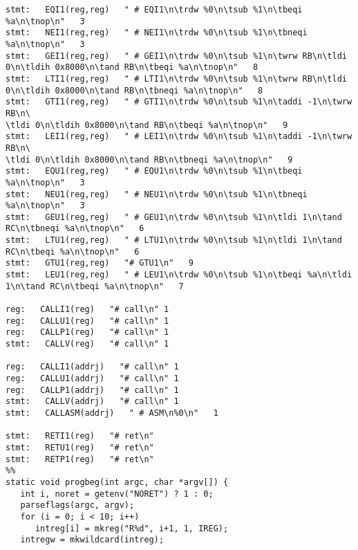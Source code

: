 {\begin{verbatim}
stmt:   EQI1(reg,reg)   " # EQI1\n\trdw %0\n\tsub %1\n\tbeqi %a\n\tnop\n"   3
stmt:   NEI1(reg,reg)   " # NEI1\n\trdw %0\n\tsub %1\n\tbneqi %a\n\tnop\n"   3
stmt:   GEI1(reg,reg)   " # GEI1\n\trdw %0\n\tsub %1\n\twrw RB\n\tldi 0\n\tldih 0x8000\n\tand RB\n\tbeqi %a\n\tnop\n"   8
stmt:   LTI1(reg,reg)   " # LTI1\n\trdw %0\n\tsub %1\n\twrw RB\n\tldi 0\n\tldih 0x8000\n\tand RB\n\tbneqi %a\n\tnop\n"   8
stmt:   GTI1(reg,reg)   " # GTI1\n\trdw %0\n\tsub %1\n\taddi -1\n\twrw RB\n\
\tldi 0\n\tldih 0x8000\n\tand RB\n\tbeqi %a\n\tnop\n"   9
stmt:   LEI1(reg,reg)   " # LEI1\n\trdw %0\n\tsub %1\n\taddi -1\n\twrw RB\n\
\tldi 0\n\tldih 0x8000\n\tand RB\n\tbneqi %a\n\tnop\n"   9
stmt:   EQU1(reg,reg)   " # EQU1\n\trdw %0\n\tsub %1\n\tbeqi %a\n\tnop\n"   3
stmt:   NEU1(reg,reg)   " # NEU1\n\trdw %0\n\tsub %1\n\tbneqi %a\n\tnop\n"   3
stmt:   GEU1(reg,reg)   " # GEU1\n\trdw %0\n\tsub %1\n\tldi 1\n\tand RC\n\tbneqi %a\n\tnop\n"   6
stmt:   LTU1(reg,reg)   " # LTU1\n\trdw %0\n\tsub %1\n\tldi 1\n\tand RC\n\tbeqi %a\n\tnop\n"   6
stmt:   GTU1(reg,reg)   "# GTU1\n"   9
stmt:   LEU1(reg,reg)   " # LEU1\n\trdw %0\n\tsub %1\n\tbeqi %a\n\tldi 1\n\tand RC\n\tbeqi %a\n\tnop\n"   7

reg:   CALLI1(reg)   "# call\n" 1
reg:   CALLU1(reg)   "# call\n" 1
reg:   CALLP1(reg)   "# call\n" 1
stmt:   CALLV(reg)   "# call\n" 1

reg:   CALLI1(addrj)   "# call\n" 1
reg:   CALLU1(addrj)   "# call\n" 1
reg:   CALLP1(addrj)   "# call\n" 1
stmt:   CALLV(addrj)   "# call\n" 1
stmt:   CALLASM(addrj)   " # ASM\n%0\n"   1

stmt:   RETI1(reg)   "# ret\n"
stmt:   RETU1(reg)   "# ret\n"
stmt:   RETP1(reg)   "# ret\n"
%%
static void progbeg(int argc, char *argv[]) {
   int i, noret = getenv("NORET") ? 1 : 0;
   parseflags(argc, argv);
   for (i = 0; i < 10; i++)
      intreg[i] = mkreg("R%d", i+1, 1, IREG);
   intregw = mkwildcard(intreg);


\end{verbatim}}
